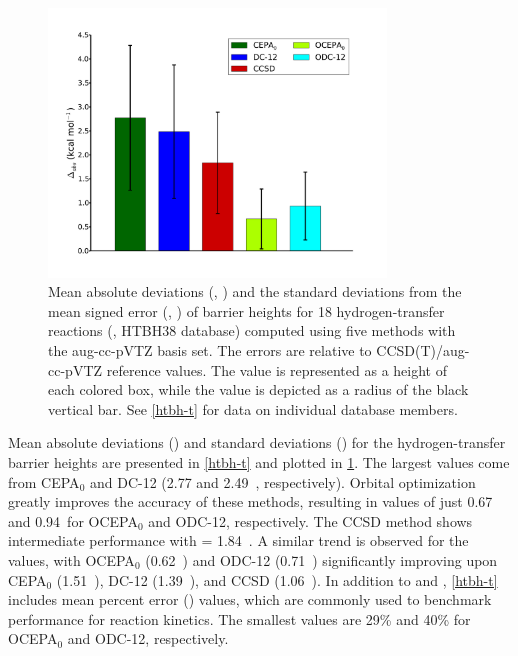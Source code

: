\begin{figure}[hb!]
	\centering
	\caption{%
        \label{htbh-f}
        Mean absolute deviations (\mae, \kcal) and the standard deviations from
        the mean signed error (\std, \kcal) of barrier heights for 18
        hydrogen-transfer reactions (,
        HTBH38 database) computed using five methods with the aug-cc-pVTZ basis
        set.
        The errors are relative to CCSD(T)/aug-cc-pVTZ reference values.
        The \mae value is represented as a height of each colored box, while the
        \std value is depicted as a radius of the black vertical bar.
        See \cref{htbh-t} for data on individual database members.
	}
	\includegraphics[width=0.8\textwidth]{figures/htbh.pdf}
\end{figure}

Mean absolute deviations (\mae) and standard deviations (\std) for the
hydrogen-transfer barrier heights are presented in \cref{htbh-t} and plotted in
\cref{htbh-f}.
The largest \mae values come from CEPA$_0$ and DC-12 (2.77 and 2.49~\kcal,
respectively).
Orbital optimization greatly improves the accuracy of these methods, resulting
in \mae values of just 0.67 and 0.94~\kcal for OCEPA$_0$ and ODC-12,
respectively.
The CCSD method shows intermediate performance with \mae = 1.84~\kcal.
A similar trend is observed for the \std values, with OCEPA$_0$ (0.62~\kcal) and
ODC-12 (0.71~\kcal) significantly improving upon CEPA$_0$ (1.51~\kcal), DC-12
(1.39~\kcal), and CCSD (1.06~\kcal).
In addition to \mae and \std, \cref{htbh-t} includes mean percent error (\rel)
values, which are commonly used to benchmark performance for reaction kinetics.
The smallest \rel values are 29\% and 40\% for OCEPA$_0$ and ODC-12,
respectively.

